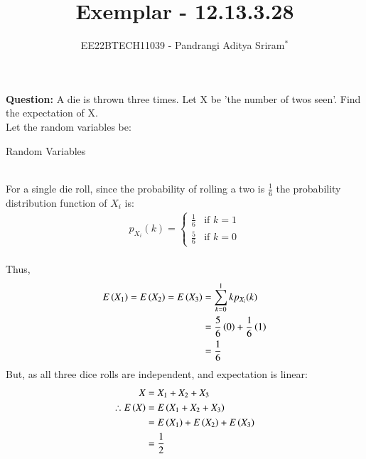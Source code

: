 \documentclass[journal,12pt,twocolumn]{IEEEtran}
\theoremstyle{remark}
\begin{document}

\vspace{3cm}

\title{Exemplar - 12.13.3.28}
\author{EE22BTECH11039 - Pandrangi Aditya Sriram$^{*}$%
}
\maketitle
\newpage
\bigskip

\renewcommand{\thefigure}{\theenumi}
\renewcommand{\thetable}{\theenumi}


\vspace{3cm}
\textbf{Question:} A die is thrown three times. Let X be 'the number of twos seen'. Find the expectation of X.\\
\solution
\fi
Let the random variables be:
\begin{table}[h!]
    
    \caption{Random Variables}
    \label{tab:12_13_3_28}
\end{table}\\
For a single die roll, since the probability of rolling a two is $\frac{1}{6}$ the probability distribution function of $X_i$ is:
\begin{align}
    p_{X_i}(k) =
    \begin{cases}
        \frac{1}{6} & \text{if } k = 1\\
        \frac{5}{6} & \text{if } k = 0
    \end{cases}
\end{align}\\
Thus, 
\begin{align}
    E\left(X_1\right) = E\left(X_2\right) = E\left(X_3\right) &= \sum_{k = 0}^{1} k p_{X_i}(k) \\
    &= \frac{5}{6}\left(0\right) + \frac{1}{6}\left(1\right)\\
    &= \frac{1}{6}
\end{align}
But, as all three dice rolls are independent, and expectation is linear:
\begin{align}
    X &= X_1 + X_2 + X_3\\
    \therefore E\left(X\right) &= E\left(X_1 + X_2 + X_3\right)\\
    &= E\left(X_1\right) + E\left(X_2\right) + E\left(X_3\right) \\
    &= \frac{1}{2}
\end{align}
\end{document}
